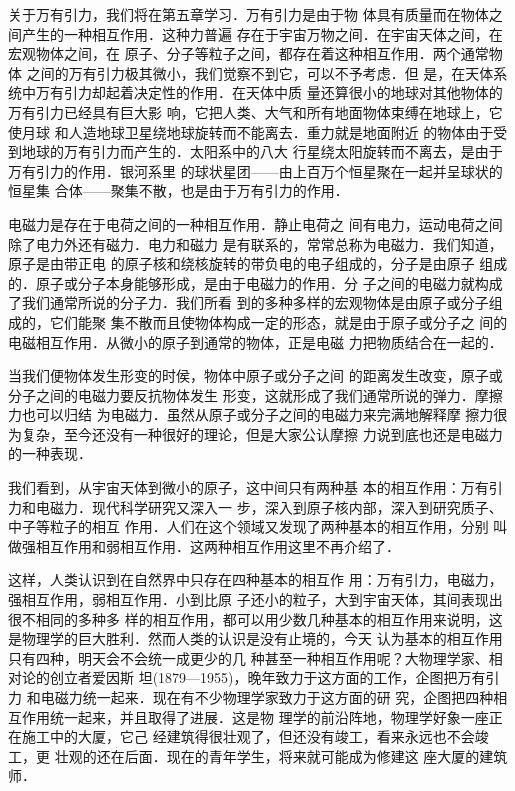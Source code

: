     关于万有引力，我们将在第五章学习．万有引力是由于物
体具有质量而在物体之间产生的一种相互作用．这种力普遍
存在于宇宙万物之间．在宇宙天体之间，在宏观物体之间，在
原子、分子等粒子之间，都存在着这种相互作用．两个通常物体
之间的万有引力极其微小，我们觉察不到它，可以不予考虑．但
是，在天体系统中万有引力却起着决定性的作用．在天体中质
量还算很小的地球对其他物体的万有引力已经具有巨大影
响，它把人类、大气和所有地面物体束缚在地球上，它使月球
和人造地球卫星绕地球旋转而不能离去．重力就是地面附近
的物体由于受到地球的万有引力而产生的．太阳系中的八大
行星绕太阳旋转而不离去，是由于万有引力的作用．银河系里
的球状星团——由上百万个恒星聚在一起并呈球状的恒星集
合体——聚集不散，也是由于万有引力的作用．

    电磁力是存在于电荷之间的一种相互作用．静止电荷之
间有电力，运动电荷之间除了电力外还有磁力．电力和磁力
是有联系的，常常总称为电磁力．我们知道，原子是由带正电
的原子核和绕核旋转的带负电的电子组成的，分子是由原子
组成的．原子或分子本身能够形成，是由于电磁力的作用．分
子之间的电磁力就构成了我们通常所说的分子力．我们所看
到的多种多样的宏观物体是由原子或分子组成的，它们能聚
集不散而且使物体构成一定的形态，就是由于原子或分子之
间的电磁相互作用．从微小的原子到通常的物体，正是电磁
力把物质结合在一起的．

    当我们便物体发生形变的时侯，物体中原子或分子之间
的距离发生改变，原子或分子之间的电磁力要反抗物体发生
形变，这就形成了我们通常所说的弹力．摩擦力也可以归结
为电磁力．虽然从原子或分子之间的电磁力来完满地解释摩
擦力很为复杂，至今还没有一种很好的理论，但是大家公认摩擦
力说到底也还是电磁力的一种表现．

    我们看到，从宇宙天体到微小的原子，这中间只有两种基
本的相互作用：万有引力和电磁力．现代科学研究又深入一
步，深入到原子核内部，深入到研究质子、中子等粒子的相互
作用．人们在这个领域又发现了两种基本的相互作用，分别
叫做强相互作用和弱相互作用．这两种相互作用这里不再介绍了．

    这样，人类认识到在自然界中只存在四种基本的相互作
用：万有引力，电磁力，强相互作用，弱相互作用．小到比原
子还小的粒子，大到宇宙天体，其间表现出很不相同的多种多
样的相互作用，都可以用少数几种基本的相互作用来说明，这
是物理学的巨大胜利．然而人类的认识是没有止境的，今天
认为基本的相互作用只有四种，明天会不会统一成更少的几
种甚至一种相互作用呢？大物理学家、相对论的创立者爱因斯
坦(1879—1955)，晚年致力于这方面的工作，企图把万有引力
和电磁力统一起来．现在有不少物理学家致力于这方面的研
究，企图把四种相互作用统一起来，并且取得了进展．这是物
理学的前沿阵地，物理学好象一座正在施工中的大厦，它己
经建筑得很壮观了，但还没有竣工，看来永远也不会竣工，更
壮观的还在后面．现在的青年学生，将来就可能成为修建这
座大厦的建筑师．


